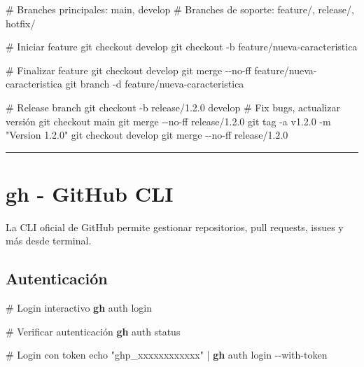 \documentclass[
  11pt,
  letterpaper,
  oneside,
  openany]{scrbook}
\newenvironment{Shaded}{}{}
\newcommand{\AttributeTok}[1]{\textcolor[rgb]{0.84,0.23,0.29}{#1}}
\newcommand{\BuiltInTok}[1]{\textcolor[rgb]{0.84,0.23,0.29}{#1}}
\newcommand{\CommentTok}[1]{\textcolor[rgb]{0.42,0.45,0.49}{#1}}
\newcommand{\ExtensionTok}[1]{\textcolor[rgb]{0.84,0.23,0.29}{\textbf{#1}}}
\newcommand{\FunctionTok}[1]{\textcolor[rgb]{0.44,0.26,0.76}{#1}}
\newcommand{\KeywordTok}[1]{\textcolor[rgb]{0.84,0.23,0.29}{#1}}
\newcommand{\NormalTok}[1]{\textcolor[rgb]{0.14,0.16,0.18}{#1}}
\newcommand{\StringTok}[1]{\textcolor[rgb]{0.01,0.18,0.38}{#1}}
\begin{document}
\begin{Shaded}
\begin{Highlighting}[]
\CommentTok{\# Branches principales: main, develop}
\CommentTok{\# Branches de soporte: feature/, release/, hotfix/}

\CommentTok{\# Iniciar feature}
\FunctionTok{git}\NormalTok{ checkout develop}
\FunctionTok{git}\NormalTok{ checkout }\AttributeTok{{-}b}\NormalTok{ feature/nueva{-}caracteristica}

\CommentTok{\# Finalizar feature}
\FunctionTok{git}\NormalTok{ checkout develop}
\FunctionTok{git}\NormalTok{ merge }\AttributeTok{{-}{-}no{-}ff}\NormalTok{ feature/nueva{-}caracteristica}
\FunctionTok{git}\NormalTok{ branch }\AttributeTok{{-}d}\NormalTok{ feature/nueva{-}caracteristica}

\CommentTok{\# Release branch}
\FunctionTok{git}\NormalTok{ checkout }\AttributeTok{{-}b}\NormalTok{ release/1.2.0 develop}
\CommentTok{\# Fix bugs, actualizar versión}
\FunctionTok{git}\NormalTok{ checkout main}
\FunctionTok{git}\NormalTok{ merge }\AttributeTok{{-}{-}no{-}ff}\NormalTok{ release/1.2.0}
\FunctionTok{git}\NormalTok{ tag }\AttributeTok{{-}a}\NormalTok{ v1.2.0 }\AttributeTok{{-}m} \StringTok{"Version 1.2.0"}
\FunctionTok{git}\NormalTok{ checkout develop}
\FunctionTok{git}\NormalTok{ merge }\AttributeTok{{-}{-}no{-}ff}\NormalTok{ release/1.2.0}
\end{Highlighting}
\end{Shaded}

\begin{center}\rule{0.5\linewidth}{0.5pt}\end{center}

\section{gh - GitHub CLI}\label{sec-gh}

La CLI oficial de GitHub permite gestionar repositorios, pull requests,
issues y más desde terminal.

\subsection{Autenticación}\label{autenticaciuxf3n}

\begin{Shaded}
\begin{Highlighting}[]
\CommentTok{\# Login interactivo}
\ExtensionTok{gh}\NormalTok{ auth login}

\CommentTok{\# Verificar autenticación}
\ExtensionTok{gh}\NormalTok{ auth status}

\CommentTok{\# Login con token}
\BuiltInTok{echo} \StringTok{"ghp\_xxxxxxxxxxxx"} \KeywordTok{|} \ExtensionTok{gh}\NormalTok{ auth login }\AttributeTok{{-}{-}with{-}token}
\end{Highlighting}
\end{Shaded}
\end{document}
